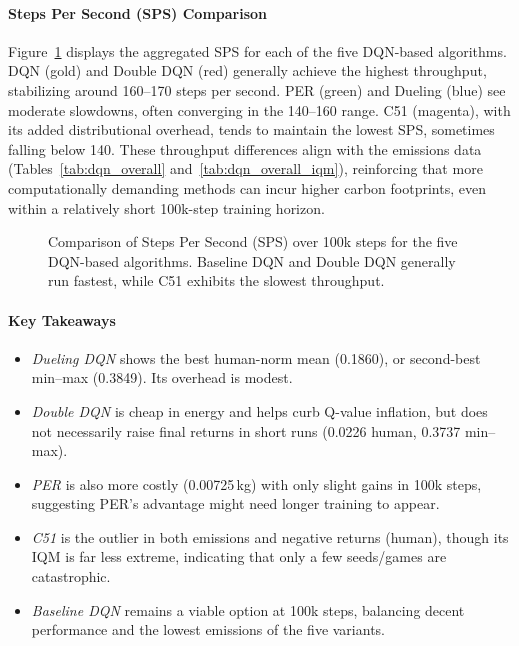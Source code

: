 \paragraph{Steps Per Second (SPS) Comparison}
Figure~\ref{fig:dqn_comp_sps} displays the aggregated SPS for each of the five DQN-based algorithms.
DQN (gold) and Double DQN (red) generally achieve the highest throughput, stabilizing around
160--170 steps per second. PER (green) and Dueling (blue) see moderate slowdowns, often converging
in the 140--160 range. C51 (magenta), with its added distributional overhead, tends to maintain
the lowest SPS, sometimes falling below 140. These throughput differences align with the 
emissions data (Tables~\ref{tab:dqn_overall} and~\vref{tab:dqn_overall_iqm}), reinforcing that more
computationally demanding methods can incur higher carbon footprints, even within a 
relatively short 100k-step training horizon.

\begin{figure}
	\centering
	
	\caption{Comparison of Steps Per Second (SPS) over 100k steps for the five DQN-based algorithms. 
		Baseline DQN and Double DQN generally run fastest, while C51 exhibits the slowest throughput.}
	\label{fig:dqn_comp_sps}
\end{figure}

\paragraph{Key Takeaways}
\begin{itemize}
	\item \emph{Dueling DQN} shows the best human-norm mean (\num{0.1860}), 
	or second-best min--max (\num{0.3849}). Its overhead is modest.
	\item \emph{Double DQN} is cheap in energy and helps curb Q-value inflation, 
	but does not necessarily raise final returns in short runs (\num{0.0226} human, \num{0.3737} min--max).
	\item \emph{PER} is also more costly (\num{0.00725}\,kg) with only slight gains in 100k steps, 
	suggesting PER's advantage might need longer training to appear.
	\item \emph{C51} is the outlier in both emissions and negative returns (human), 
	though its IQM is far less extreme, indicating that only a few seeds/games are catastrophic.
	\item \emph{Baseline DQN} remains a viable option at 100k steps, 
	balancing decent performance and the lowest emissions of the five variants.
\end{itemize}

